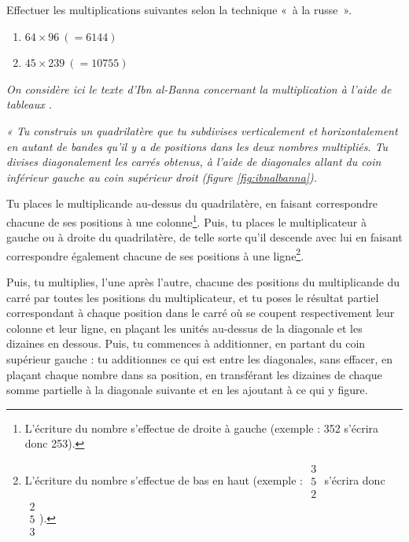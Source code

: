 \begin{td}
Effectuer les multiplications suivantes selon la technique «~à la russe~».
\begin{enumerate}
\item $64 \times 96\ (= 6144)$
\item $45 \times 239\ (= 10755)$
\end{enumerate}

\end{td} 

\begin{td}\label{td:ibnalbanna}
\em
On consid\`ere ici le texte d'Ibn al-Banna concernant la multiplication
\`a l'aide de tableaux  \cite{chabert}.

\begin{minipage}{15cm}
\footnotesize\em
« Tu construis un quadrilat\`ere que tu subdivises verticalement et
horizontalement en autant de bandes qu'il y a de positions dans les
deux nombres multipli\'es. Tu divises diagonalement les carr\'es
obtenus, \`a l'aide de diagonales allant du coin inf\'erieur gauche au
coin sup\'erieur droit (figure \ref{fig:ibnalbanna}).

Tu places le multiplicande au-dessus du quadrilat\`ere, en faisant 
correspondre chacune de ses positions \`a une colonne\footnote{L'écriture
du nombre s'effectue de droite à gauche (exemple : 352 s'écrira donc 253).}. 
Puis, tu places le multiplicateur \`a gauche ou \`a droite du quadrilat\`ere,
de telle sorte qu'il descende avec lui en faisant correspondre \'egalement 
chacune de ses positions \`a une ligne\footnote{L'écriture
du nombre s'effectue de bas en haut (exemple : {\tiny$\begin{array}{c}3\\5\\2\end{array}$} 
s'écrira donc {\tiny$\begin{array}{c}2\\5\\3\end{array}$}).}. 

Puis, tu multiplies, 
l'une apr\`es l'autre, chacune des positions du multiplicande du carr\'e 
par toutes les positions du multiplicateur, et tu poses le r\'esultat 
partiel correspondant \`a chaque position dans le carr\'e o\`u se coupent 
respectivement leur colonne et leur ligne, en pla\c{c}ant les unit\'es 
au-dessus de la diagonale et les dizaines en dessous. Puis, tu
commences \`a additionner, en partant du coin sup\'erieur gauche :
tu additionnes ce qui est entre les diagonales, sans effacer, 
en pla\c{c}ant chaque nombre dans sa position, en transf\'erant 
les dizaines de chaque somme partielle \`a la diagonale suivante et
en les ajoutant \`a ce qui y figure. 


\end{minipage}
\end{td}
